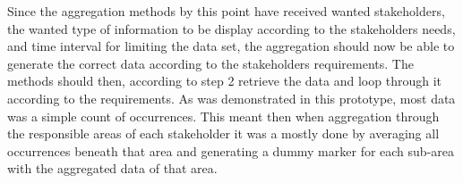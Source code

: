 Since the aggregation methods by this point have received wanted stakeholders,
the wanted type of information to be display according to the stakeholders
needs, and time interval for limiting the data set, the aggregation should now
be able to generate the correct data according to the stakeholders
requirements. The methods should then, according to step 2 retrieve the data
and loop through it according to the requirements. As was demonstrated in this 
prototype, most data was a simple count of occurrences. This meant then when
aggregation through the responsible areas of each stakeholder it was a mostly
done by averaging all occurrences beneath that area and generating a dummy
marker for each sub-area with the aggregated data of that area.


